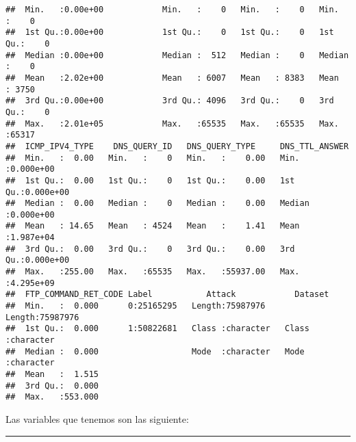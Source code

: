 \documentclass[
]{article}
\begin{document}
\begin{verbatim}
##  Min.   :0.00e+00            Min.   :    0   Min.   :    0   Min.   :    0  
##  1st Qu.:0.00e+00            1st Qu.:    0   1st Qu.:    0   1st Qu.:    0  
##  Median :0.00e+00            Median :  512   Median :    0   Median :    0  
##  Mean   :2.02e+00            Mean   : 6007   Mean   : 8383   Mean   : 3750  
##  3rd Qu.:0.00e+00            3rd Qu.: 4096   3rd Qu.:    0   3rd Qu.:    0  
##  Max.   :2.01e+05            Max.   :65535   Max.   :65535   Max.   :65317  
##  ICMP_IPV4_TYPE    DNS_QUERY_ID   DNS_QUERY_TYPE     DNS_TTL_ANSWER     
##  Min.   :  0.00   Min.   :    0   Min.   :    0.00   Min.   :0.000e+00  
##  1st Qu.:  0.00   1st Qu.:    0   1st Qu.:    0.00   1st Qu.:0.000e+00  
##  Median :  0.00   Median :    0   Median :    0.00   Median :0.000e+00  
##  Mean   : 14.65   Mean   : 4524   Mean   :    1.41   Mean   :1.987e+04  
##  3rd Qu.:  0.00   3rd Qu.:    0   3rd Qu.:    0.00   3rd Qu.:0.000e+00  
##  Max.   :255.00   Max.   :65535   Max.   :55937.00   Max.   :4.295e+09  
##  FTP_COMMAND_RET_CODE Label           Attack            Dataset         
##  Min.   :  0.000      0:25165295   Length:75987976    Length:75987976   
##  1st Qu.:  0.000      1:50822681   Class :character   Class :character  
##  Median :  0.000                   Mode  :character   Mode  :character  
##  Mean   :  1.515                                                        
##  3rd Qu.:  0.000                                                        
##  Max.   :553.000
\end{verbatim}

Las variables que tenemos son las siguiente:

\begin{center}\rule{0.5\linewidth}{0.5pt}\end{center}
\end{document}
